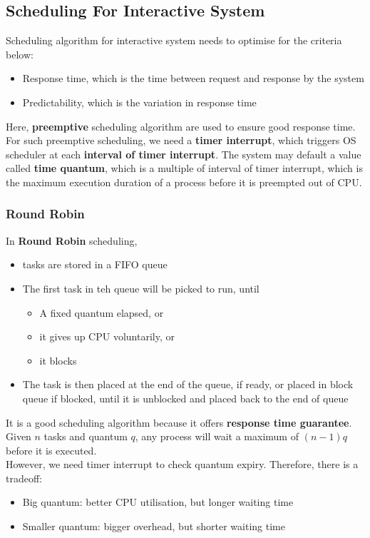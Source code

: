 \documentclass[12pt]{article}
\theoremstyle{definition}
\begin{document}
\subsection{Scheduling For Interactive System}
Scheduling algorithm for interactive system needs to optimise for the criteria below:
\begin{itemize}
\item Response time, which is the time between request and response by the system
\item Predictability, which is the variation in response time
\end{itemize} 
Here, \textbf{preemptive} scheduling algorithm are used to ensure good response time. For such preemptive scheduling, we need a \textbf{timer interrupt}, which triggers OS scheduler at each \textbf{interval of timer interrupt}. The system may default a value called \textbf{time quantum}, which is a multiple of interval of timer interrupt, which is the maximum execution duration of a process before it is preempted out of CPU.
\subsubsection{Round Robin}
In \textbf{Round Robin} scheduling, 
\begin{itemize}
  \item tasks are stored in a FIFO queue
  \item The first task in teh queue will be picked to run, until
  \begin{itemize}
  \item A fixed quantum elapsed, or
  \item it gives up CPU voluntarily, or
  \item it blocks
  \end{itemize}
  \item The task is then placed at the end of the queue, if ready, or placed in block queue if blocked, until it is unblocked and placed back to the end of queue
\end{itemize}
It is a good scheduling algorithm because it offers \textbf{response time guarantee}. Given $n$ tasks and quantum $q$, any process will wait a maximum of $(n-1)q$ before it is executed.\\
However, we need timer interrupt to check quantum expiry. Therefore, there is a tradeoff:
\begin{itemize}
  \item Big quantum: better CPU utilisation, but longer waiting time
  \item Smaller quantum: bigger overhead, but shorter waiting time
\end{itemize}
\end{document}

